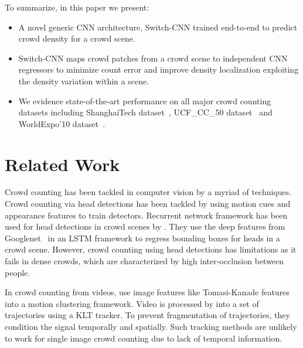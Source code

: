 \documentclass[10pt,twocolumn,letterpaper]{article}
\begin{document}
To summarize, in this paper we present:
\begin{itemize}
\item A novel generic CNN architecture, Switch-CNN trained end-to-end to predict crowd density for a crowd scene.
\item Switch-CNN maps crowd patches from a crowd scene to independent CNN regressors to minimize count error and improve density localization exploiting the density variation within a scene. 
\item We evidence state-of-the-art performance on all major crowd counting datasets including ShanghaiTech dataset~\cite{zhang2016single}, UCF\_CC\_50 dataset~\cite{idrees2013multi} and WorldExpo'10 dataset~\cite{zhang2015cross}.
\end{itemize}


	




\section{Related Work}
Crowd counting has been tackled in computer vision by a myriad of techniques. Crowd counting via head detections has been tackled by \cite{wu2005detection,wang2011automatic,viola2005detecting} using motion cues and appearance features to train detectors. Recurrent network framework has been used for head detections in crowd scenes by \cite{stewart2015end}. They use the deep features from Googlenet~\cite{szegedy2015going} in an LSTM framework to regress bounding boxes for heads in a crowd scene. However, crowd counting using head detections has limitations as it fails in dense crowds, which are characterized by high inter-occlusion between people.

In crowd counting from videos, \cite{brostow2006unsupervised} use image features like Tomasi-Kanade features into a motion clustering framework. Video is processed by \cite{rabaud2006counting}  into a set of trajectories using a KLT tracker. To prevent fragmentation of trajectories, they condition the signal temporally and spatially. Such tracking methods are unlikely to work for single image crowd counting due to lack of temporal information.
\end{document}
